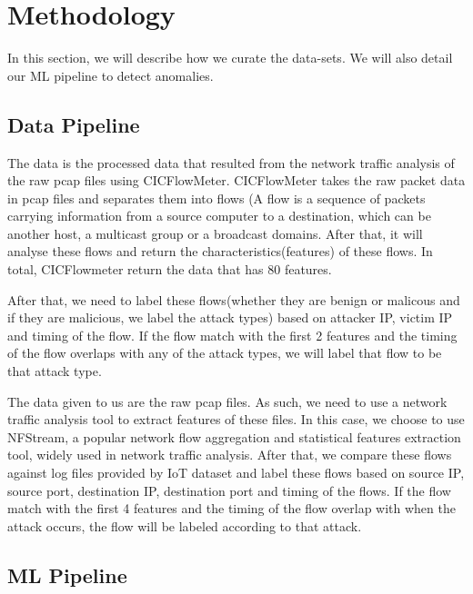 \section{Methodology}
\label{sec:method}
\begin{method}
In this section, we will describe how we curate the data-sets. We will also detail our ML pipeline to detect anomalies.
\subsection{Data Pipeline}
 The data is the processed data that resulted from the network traffic analysis of the raw pcap files using CICFlowMeter. CICFlowMeter takes the raw packet data in pcap files  and separates them into flows (A flow is a sequence of packets carrying information from a source computer to a destination, which can be another host, a multicast group or a broadcast domains. After that, it will analyse these flows and return the characteristics(features) of these flows. In total, CICFlowmeter return the data that has 80 features.

After that, we need to label these flows(whether they are benign or malicous and if they are malicious, we label the attack types) based on attacker IP, victim IP and timing of the flow. If the flow match with the first 2 features and the timing of the flow overlaps with any of the attack types, we will label that flow to be that attack type. 

The data given to us are the raw pcap files. As such, we need to use a network traffic analysis tool to extract features of these files. In this case, we choose to use NFStream, a popular network flow aggregation and statistical features extraction tool, widely used in network traffic analysis. After that, we compare these flows against log files provided by IoT dataset and label these flows based on source IP, source port, destination IP, destination port and timing of the flows. If the flow match with the first 4 features and the timing of the flow overlap with when the attack occurs, the flow will be labeled according to that attack.

\subsection{ML Pipeline}
\\
\\
\\
\\


\end{method}
